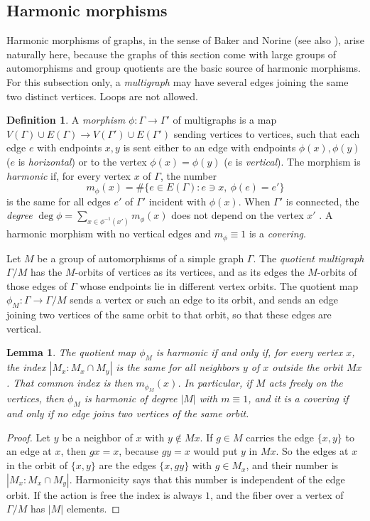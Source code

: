 \documentclass[12pt,letterpaper]{article}
\numberwithin{equation}{section}
\newtheorem{lemma}[theorem]{Lemma}
\theoremstyle{definition}
\newtheorem{definition}[theorem]{Definition}
\begin{document}
\subsection{Harmonic morphisms}\label{subsec:harmonic}
Harmonic morphisms of graphs, in the sense of Baker and Norine \cite{BN09} (see also \cite{MJ26}), arise naturally here, because the graphs of this section come with large groups of automorphisms and group quotients are the basic source of harmonic morphisms. For this subsection only, a \emph{multigraph} may have several edges joining the same two distinct vertices. Loops are not allowed.
\begin{definition}
A \emph{morphism} $\phi\colon\Gamma\to\Gamma'$ of multigraphs is a map $V(\Gamma)\cup E(\Gamma)\to V(\Gamma')\cup E(\Gamma')$ sending vertices to vertices, such that each edge $e$ with endpoints $x,y$ is sent either to an edge with endpoints $\phi(x),\phi(y)$ ($e$ is \emph{horizontal}) or to the vertex $\phi(x)=\phi(y)$ ($e$ is \emph{vertical}). The morphism is \emph{harmonic} if, for every vertex $x$ of $\Gamma$, the number
\[
m_\phi(x)=\#\{e\in E(\Gamma): e\ni x,\ \phi(e)=e'\}
\]
is the same for all edges $e'$ of $\Gamma'$ incident with $\phi(x)$. When $\Gamma'$ is connected, the \emph{degree} $\deg\phi=\sum_{x\in\phi^{-1}(x')}m_\phi(x)$ does not depend on the vertex $x'$ \cite{BN09}. A harmonic morphism with no vertical edges and $m_\phi\equiv1$ is a \emph{covering}.
\end{definition}
Let $M$ be a group of automorphisms of a simple graph $\Gamma$. The \emph{quotient multigraph} $\Gamma/M$ has the $M$-orbits of vertices as its vertices, and as its edges the $M$-orbits of those edges of $\Gamma$ whose endpoints lie in different vertex orbits. The quotient map $\phi_M\colon\Gamma\to\Gamma/M$ sends a vertex or such an edge to its orbit, and sends an edge joining two vertices of the same orbit to that orbit, so that these edges are vertical.
\begin{lemma}\label{lem:harmquot}
The quotient map $\phi_M$ is harmonic if and only if, for every vertex $x$, the index $|M_x:M_x\cap M_y|$ is the same for all neighbors $y$ of $x$ outside the orbit $Mx$. That common index is then $m_{\phi_M}(x)$. In particular, if $M$ acts freely on the vertices, then $\phi_M$ is harmonic of degree $|M|$ with $m\equiv1$, and it is a covering if and only if no edge joins two vertices of the same orbit.
\end{lemma}
\begin{proof}
Let $y$ be a neighbor of $x$ with $y\notin Mx$. If $g\in M$ carries the edge $\{x,y\}$ to an edge at $x$, then $gx=x$, because $gy=x$ would put $y$ in $Mx$. So the edges at $x$ in the orbit of $\{x,y\}$ are the edges $\{x,gy\}$ with $g\in M_x$, and their number is $|M_x:M_x\cap M_y|$. Harmonicity says that this number is independent of the edge orbit. If the action is free the index is always $1$, and the fiber over a vertex of $\Gamma/M$ has $|M|$ elements.
\end{proof}
\end{document}
